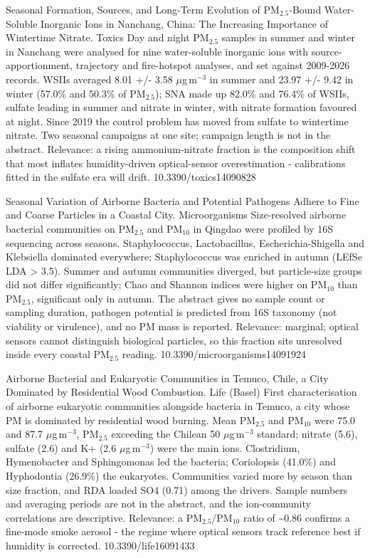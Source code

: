 \documentclass[10pt]{article}
\begin{document}
{Seasonal Formation, Sources, and Long-Term Evolution of PM$_{2.5}$-Bound Water-Soluble Inorganic Ions in Nanchang, China: The Increasing Importance of Wintertime Nitrate.}
{Toxics}
{Day and night PM$_{2.5}$ samples in summer and winter in Nanchang were analysed for nine water-soluble inorganic ions with source-apportionment, trajectory and fire-hotspot analyses, and set against 2009-2026 records. WSIIs averaged 8.01 +/- 3.58 $\mu$g\,m$^{-3}$ in summer and 23.97 +/- 9.42 in winter (57.0\% and 50.3\% of PM$_{2.5}$); SNA made up 82.0\% and 76.4\% of WSIIs, sulfate leading in summer and nitrate in winter, with nitrate formation favoured at night. Since 2019 the control problem has moved from sulfate to wintertime nitrate. Two seasonal campaigns at one site; campaign length is not in the abstract. Relevance: a rising ammonium-nitrate fraction is the composition shift that most inflates humidity-driven optical-sensor overestimation - calibrations fitted in the sulfate era will drift.}
{10.3390/toxics14090828}

{Seasonal Variation of Airborne Bacteria and Potential Pathogens Adhere to Fine and Coarse Particles in a Coastal City.}
{Microorganisms}
{Size-resolved airborne bacterial communities on PM$_{2.5}$ and PM$_{10}$ in Qingdao were profiled by 16S sequencing across seasons. Staphylococcus, Lactobacillus, Escherichia-Shigella and Klebsiella dominated everywhere; Staphylococcus was enriched in autumn (LEfSe LDA > 3.5). Summer and autumn communities diverged, but particle-size groups did not differ significantly; Chao and Shannon indices were higher on PM$_{10}$ than PM$_{2.5}$, significant only in autumn. The abstract gives no sample count or sampling duration, pathogen potential is predicted from 16S taxonomy (not viability or virulence), and no PM mass is reported. Relevance: marginal; optical sensors cannot distinguish biological particles, so this fraction sits unresolved inside every coastal PM$_{2.5}$ reading.}
{10.3390/microorganisms14091924}

{Airborne Bacterial and Eukaryotic Communities in Temuco, Chile, a City Dominated by Residential Wood Combustion.}
{Life (Basel)}
{First characterisation of airborne eukaryotic communities alongside bacteria in Temuco, a city whose PM is dominated by residential wood burning. Mean PM$_{2.5}$ and PM$_{10}$ were 75.0 and 87.7 $\mu$g\,m$^{-3}$, PM$_{2.5}$ exceeding the Chilean 50 $\mu$g\,m$^{-3}$ standard; nitrate (5.6), sulfate (2.6) and K+ (2.6 $\mu$g\,m$^{-3}$) were the main ions. Clostridium, Hymenobacter and Sphingomonas led the bacteria; Coriolopsis (41.0\%) and Hyphodontia (26.9\%) the eukaryotes. Communities varied more by season than size fraction, and RDA loaded SO4 (0.71) among the drivers. Sample numbers and averaging periods are not in the abstract, and the ion-community correlations are descriptive. Relevance: a PM$_{2.5}$/PM$_{10}$ ratio of \textasciitilde{}0.86 confirms a fine-mode smoke aerosol - the regime where optical sensors track reference best if humidity is corrected.}
{10.3390/life16091433}
\end{document}
